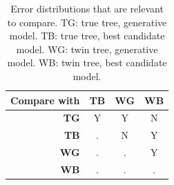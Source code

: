 \begin{table}
  \begin{tabular}{ | r | c | c | c | }
    \hline
    \textbf{Compare with} & \textbf{TB} & \textbf{WG} & \textbf{WB} \\ 
    \hline
    \textbf{TG} & Y & Y & N \\
    \textbf{TB} & . & N & Y \\
    \textbf{WG} & . & . & Y \\
    \textbf{WB} & . & . & . \\
    \hline
  \end{tabular}
  \caption{
    Error distributions that are relevant to compare.
    TG: true tree, generative model.
    TB: true tree, best candidate model.
    WG: twin tree, generative model.
    WB: twin tree, best candidate model.
  }
  \label{tab:relevant_comparisions}
\end{table}

